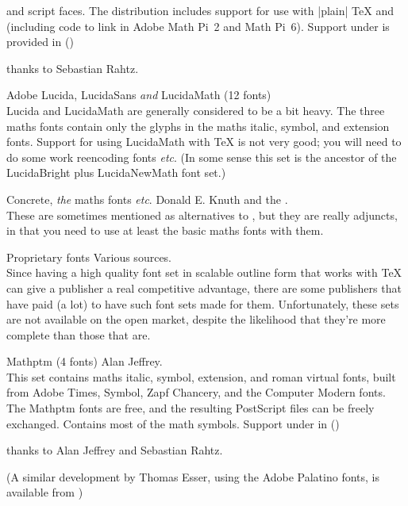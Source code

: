 \begin{booklist}
    and script faces.  The distribution includes support for use with
    |plain| \TeX{} and \LaTeXo{} (including code to link in Adobe Math
    Pi~2 and Math Pi~6).
    Support under \LaTeXe{} is provided in
\htmlignore
     ()
\endhtmlignore
\begin{htmlversion}
\end{htmlversion}
    thanks to Sebastian Rahtz.
\item[Adobe Lucida, LucidaSans \emph{and} LucidaMath] (12 fonts)\\
    Lucida and LucidaMath are generally considered to be a bit heavy.
    The three maths fonts contain only the glyphs in the 
    maths italic, symbol, and extension fonts.
    Support for using LucidaMath with \TeX{} is not very good;
    you will need to do some work reencoding fonts \emph{etc}.
    (In some sense this set is the ancestor of the LucidaBright
    plus LucidaNewMath font set.)
\item[Concrete, \emph{the} \acro{AMS} maths fonts \emph{etc}.]Donald
  E. Knuth and the .\\
    These are sometimes mentioned as alternatives to , but they are
    really adjuncts, in that you need to use at least the basic 
    maths fonts with them.
\item[Proprietary fonts] Various sources.\\
    Since having a high quality font set in scalable outline form that
    works with \TeX{} can give a publisher a real competitive advantage, there
    are some publishers that have paid (a lot) to have such font sets made
    for them.  Unfortunately, these sets are not available on the open
    market, despite the likelihood that they're more complete than
    those that are.
\item[Mathptm] (4 fonts) Alan Jeffrey.\\
   This set contains maths italic, symbol, extension, and roman 
   virtual fonts, built from Adobe Times, Symbol, Zapf Chancery, and
   the Computer Modern fonts.  The Mathptm fonts are free, and
   the resulting PostScript files can be freely exchanged.
   Contains most of the  math symbols. 
   Support under \LaTeXe{} in
\htmlignore
     ()
\endhtmlignore
\begin{htmlversion}
\end{htmlversion}
    thanks to Alan Jeffrey and Sebastian Rahtz.  

    (A similar development by Thomas Esser, using the Adobe Palatino
    fonts, is available from )
\end{booklist}

